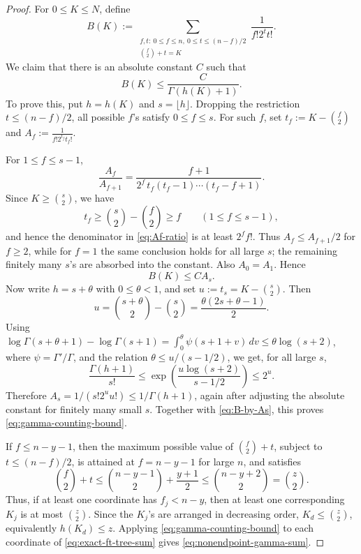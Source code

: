 \documentclass[11pt,reqno]{amsart}
\theoremstyle{definition}
\theoremstyle{remark}
\renewcommand\le{\leqslant}
\renewcommand\ge{\geqslant}
\begin{document}
\begin{proof}
For $0\le K\le N$, define
\[
        B(K):=\sum_{\substack{f,t:\ 0\le f\le n,\ 0\le t\le(n-f)/2\\ \binom f2+t=K}}
        \frac1{f!2^t t!}.
\]
We claim that there is an absolute constant $C$ such that
\begin{equation}\label{eq:gamma-counting-bound}
        B(K)\le \frac{C}{\Gamma(h(K)+1)}.
\end{equation}
To prove this, put $h=h(K)$ and $s=\lfloor h\rfloor$. Dropping the restriction $t\le(n-f)/2$, all possible $f$'s satisfy $0\le f\le s$. For such $f$, set
$t_f:=K-\binom f2$ and $A_f:=\frac1{f!2^{t_f}t_f!}$.

For $1\le f\le s-1$,
\begin{equation}\label{eq:Af-ratio}
        \frac{A_f}{A_{f+1}}
        =\frac{f+1}{2^f\,t_f(t_f-1)\cdots(t_f-f+1)}.
\end{equation}
Since $K\ge\binom{s}{2}$, we have
\[
        t_f\ge \binom{s}{2}-\binom f2\ge f
        \qquad (1\le f\le s-1),
\]
and hence the denominator in \eqref{eq:Af-ratio} is at least $2^f f!$. Thus $A_f\le A_{f+1}/2$ for $f\ge2$, while for $f=1$ the same conclusion holds for all large $s$; the remaining finitely many $s$'s are absorbed into the constant. Also $A_0=A_1$. Hence
\begin{equation}\label{eq:B-by-As}
        B(K)\le C A_s .
\end{equation}
Now write $h=s+\theta$ with $0\le\theta<1$, and set $u:=t_s=K-\binom{s}{2}$. Then
\[
        u=\binom{s+\theta}{2}-\binom{s}{2}
          =\frac{\theta(2s+\theta-1)}2.
\]
Using $\log\Gamma(s+\theta+1)-\log\Gamma(s+1)=\int_0^\theta\psi(s+1+v)\,dv\le \theta\log(s+2)$, where $\psi=\Gamma'/\Gamma$, and the relation $\theta\le u/(s-1/2)$, we get, for all large $s$,
\[
        \frac{\Gamma(h+1)}{s!}
        \le \exp\left(\frac{u\log(s+2)}{s-1/2}\right)
        \le 2^u .
\]
Therefore $A_s=1/(s!2^u u!)\le 1/\Gamma(h+1)$, again after adjusting the absolute constant for finitely many small $s$. Together with \eqref{eq:B-by-As}, this proves \eqref{eq:gamma-counting-bound}.

If $f\le n-y-1$, then the maximum possible value of $\binom f2+t$, subject to $t\le(n-f)/2$, is attained at $f=n-y-1$ for large $n$, and satisfies
\[
        \binom f2+t
        \le \binom{n-y-1}{2}+\frac{y+1}{2}
        \le \binom{n-y+2}{2}=\binom z2 .
\]
Thus, if at least one coordinate has $f_j<n-y$, then at least one corresponding $K_j$ is at most $\binom z2$. Since the $K_j$'s are arranged in decreasing order, $K_d\le\binom z2$, equivalently $h(K_d)\le z$. Applying \eqref{eq:gamma-counting-bound} to each coordinate of \eqref{eq:exact-ft-tree-sum} gives \eqref{eq:nonendpoint-gamma-sum}.
\end{proof}
\end{document}
